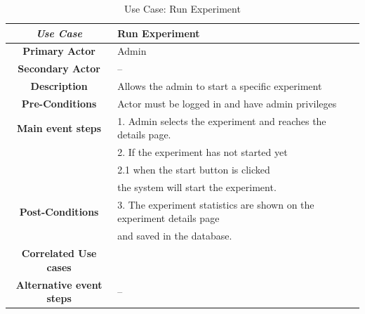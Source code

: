 \begin{table}[ht!]
    \centering
    \caption{Use Case: Run Experiment}
    \begin{tabularx}{\textwidth}{|Sl|S{X}|}
        \hline
        \textbf{\textit{Use Case}}       & \textbf{Run Experiment}                                                     \\ \hline
        \textbf{Primary Actor}           & Admin                                                                       \\ \hline
        \textbf{Secondary Actor}         & --                                                                          \\ \hline
        \textbf{Description}             & Allows the admin to start a specific experiment                             \\ \hline
        \textbf{Pre-Conditions}          & Actor must be logged in and have admin privileges                           \\ \hline
        \textbf{Main event steps}        & 1. Admin selects the experiment and reaches the details page.               \\
                                         & 2. If the experiment has not started yet                                         \\
                                         & \hspace{1em} 2.1 when the start button is clicked \\
                                         & \hspace{2.5em} the system will start the experiment.                      \\
        \textbf{Post-Conditions}         & 3. The experiment statistics are shown on the experiment details page          \\
                                         & and saved in the database.                                                  \\ \hline
        \textbf{Correlated Use cases}    &                                                                             \\ \hline
        \textbf{Alternative event steps} & --                                                                          \\ \hline
    \end{tabularx}
\end{table}


